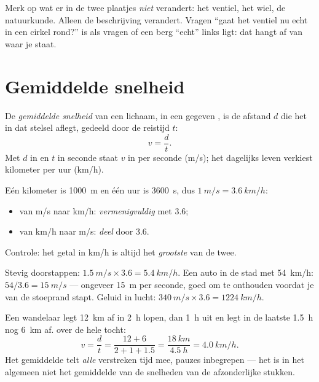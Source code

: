 \begin{remark}
Merk op wat er in de twee plaatjes \emph{niet} verandert: het ventiel,
het wiel, de natuurkunde. Alleen de beschrijving verandert. Vragen ``gaat
het ventiel nu echt in een cirkel rond?'' is als vragen of een berg
``echt'' links ligt: dat hangt af van waar je staat.
\end{remark}

\section{Gemiddelde snelheid}

\begin{definition}\label{def:g10:relative-motion:speed}
De \emph{gemiddelde snelheid} van een lichaam,
in een gegeven , is de afstand $d$ die het in dat
stelsel aflegt, gedeeld door de reistijd $t$:
\[
v = \frac{d}{t} .
\]
Met $d$ in  en $t$ in seconde staat $v$ in  per seconde
(\unit{m/s}); het dagelijks leven verkiest kilometer per uur
(\unit{km/h}).
\end{definition}

\begin{method}\label{met:g10:relative-motion:convert}
Eén kilometer is \qty{1000}{m} en één uur is \qty{3600}{s}, dus
$\qty{1}{m/s} = \qty{3.6}{km/h}$:
\begin{itemize}
  \item van \unit{m/s} naar \unit{km/h}: \emph{vermenigvuldig} met
        $3.6$;
  \item van \unit{km/h} naar \unit{m/s}: \emph{deel} door $3.6$.
\end{itemize}
Controle: het getal in \unit{km/h} is altijd het \emph{grootste} van de
twee.
\end{method}

\begin{example}\label{ex:g10:relative-motion:convert}
Stevig doorstappen: $\qty{1.5}{m/s} \times 3.6 = \qty{5.4}{km/h}$. Een
auto in de stad met \qty{54}{km/h}: $54 / 3.6 = \qty{15}{m/s}$ ---
ongeveer \qty{15}{m} per seconde, goed om te onthouden voordat je van de
stoeprand stapt. Geluid in lucht:
$\qty{340}{m/s} \times 3.6 = \qty{1224}{km/h}$.
\end{example}

\begin{example}\label{ex:g10:relative-motion:hike}
Een wandelaar legt \qty{12}{km} af in \qty{2}{h} lopen,  dan
\qty{1}{h} uit en legt in de laatste \qty{1.5}{h} nog \qty{6}{km} af.
 over de hele tocht:
\[
v = \frac{d}{t} = \frac{12 + 6}{2 + 1 + 1.5}
= \frac{\qty{18}{km}}{\qty{4.5}{h}} = \qty{4.0}{km/h}.
\]
Het gemiddelde telt \emph{alle} verstreken tijd mee, pauzes inbegrepen
--- het is in het algemeen niet het gemiddelde van de snelheden van de
afzonderlijke stukken.
\end{example}

